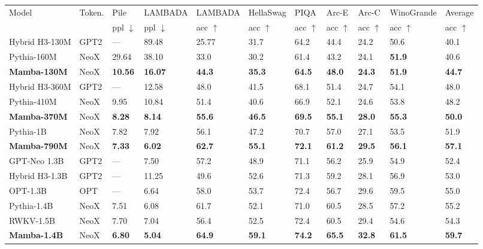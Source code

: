 \begin{tabular}{lllllllllll}
\hline
Model & Token. & Pile & LAMBADA & LAMBADA & HellaSwag & PIQA & Arc-E & Arc-C & WinoGrande & Average \\
 &  & ppl $\downarrow$ & ppl $\downarrow$ & acc $\uparrow$ & acc $\uparrow$ & acc $\uparrow$ & acc $\uparrow$ & acc $\uparrow$ & acc $\uparrow$ & acc $\uparrow$ \\
\hline
Hybrid H3-130M & GPT2 & — & 89.48 & 25.77 & 31.7 & 64.2 & 44.4 & 24.2 & 50.6 & 40.1 \\
Pythia-160M & NeoX & 29.64 & 38.10 & 33.0 & 30.2 & 61.4 & 43.2 & 24.1 & \textbf{51.9} & 40.6 \\
\textbf{Mamba-130M} & NeoX & \textbf{10.56} & \textbf{16.07} & \textbf{44.3} & \textbf{35.3} & \textbf{64.5} & \textbf{48.0} & \textbf{24.3} & \textbf{51.9} & \textbf{44.7} \\
\hline
Hybrid H3-360M & GPT2 & — & 12.58 & 48.0 & 41.5 & 68.1 & 51.4 & 24.7 & 54.1 & 48.0 \\
Pythia-410M & NeoX & 9.95 & 10.84 & 51.4 & 40.6 & 66.9 & 52.1 & 24.6 & 53.8 & 48.2 \\
\textbf{Mamba-370M} & NeoX & \textbf{8.28} & \textbf{8.14} & \textbf{55.6} & \textbf{46.5} & \textbf{69.5} & \textbf{55.1} & \textbf{28.0} & \textbf{55.3} & \textbf{50.0} \\
\hline
Pythia-1B & NeoX & 7.82 & 7.92 & 56.1 & 47.2 & 70.7 & 57.0 & 27.1 & 53.5 & 51.9 \\
\textbf{Mamba-790M} & NeoX & \textbf{7.33} & \textbf{6.02} & \textbf{62.7} & \textbf{55.1} & \textbf{72.1} & \textbf{61.2} & \textbf{29.5} & \textbf{56.1} & \textbf{57.1} \\
\hline
GPT-Neo 1.3B & GPT2 & — & 7.50 & 57.2 & 48.9 & 71.1 & 56.2 & 25.9 & 54.9 & 52.4 \\
Hybrid H3-1.3B & GPT2 & — & 11.25 & 49.6 & 52.6 & 71.3 & 59.2 & 28.1 & 56.9 & 53.0 \\
OPT-1.3B & OPT & — & 6.64 & 58.0 & 53.7 & 72.4 & 56.7 & 29.6 & 59.5 & 55.0 \\
Pythia-1.4B & NeoX & 7.51 & 6.08 & 61.7 & 52.1 & 71.0 & 60.5 & 28.5 & 57.2 & 55.2 \\
RWKV-1.5B & NeoX & 7.70 & 7.04 & 56.4 & 52.5 & 72.4 & 60.5 & 29.4 & 54.6 & 54.3 \\
\textbf{Mamba-1.4B} & NeoX & \textbf{6.80} & \textbf{5.04} & \textbf{64.9} & \textbf{59.1} & \textbf{74.2} & \textbf{65.5} & \textbf{32.8} & \textbf{61.5} & \textbf{59.7} \\

\end{tabular}
